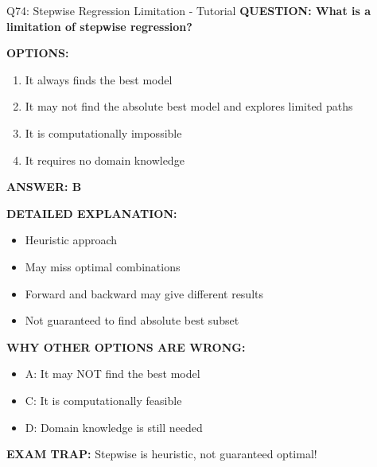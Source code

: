 \documentclass[8pt]{beamer}
\begin{document}
	\begin{frame}{Q74: Stepwise Regression Limitation - Tutorial}
		\fontsize{6.5}{7.5}\selectfont
		\textbf{QUESTION: What is a limitation of stepwise regression?}
		
		\vspace{0.1cm}
		\textbf{OPTIONS:}
		\begin{enumerate}
			\item It always finds the best model
			\item It may not find the absolute best model and explores limited paths
			\item It is computationally impossible
			\item It requires no domain knowledge
		\end{enumerate}
		
		\vspace{0.1cm}
		\textcolor{myblue}{\textbf{ANSWER: B}}
		
		\vspace{0.1cm}
		\textbf{DETAILED EXPLANATION:}
		\begin{itemize}
			\item Heuristic approach
			\item May miss optimal combinations
			\item Forward and backward may give different results
			\item Not guaranteed to find absolute best subset
		\end{itemize}
		
		\vspace{0.1cm}
		\textcolor{myred}{\textbf{WHY OTHER OPTIONS ARE WRONG:}}
		\begin{itemize}
			\item \textcolor{myred}{A:} It may NOT find the best model
			\item \textcolor{myred}{C:} It is computationally feasible
			\item \textcolor{myred}{D:} Domain knowledge is still needed
		\end{itemize}
		
		\textcolor{myred}{\textbf{EXAM TRAP:}} Stepwise is \textcolor{myblue}{heuristic}, not guaranteed optimal!
	\end{frame}
	
\end{document}

